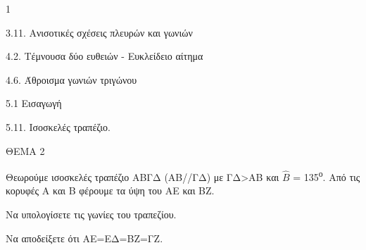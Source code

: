 \begin{ylh}{1}
    \item 3.11. Ανισοτικές σχέσεις πλευρών και γωνιών
    \item 4.2. Τέμνουσα δύο ευθειών - Ευκλείδειο αίτημα
    \item 4.6. Άθροισμα γωνιών τριγώνου
    \item 5.1 Εισαγωγή
    \item 5.11. Ισοσκελές τραπέζιο.
\end{ylh}

ΘΕΜΑ 2

Θεωρούμε ισοσκελές τραπέζιο ΑΒΓΔ (ΑΒ//ΓΔ) με ΓΔ\textgreater ΑΒ και $\widehat{Β}$ = 135\textsuperscript{ο}. Από τις κορυφές Α και Β φέρουμε τα ύψη του ΑΕ και ΒΖ.

\begin{alist}
\item Να υπολογίσετε τις γωνίες του τραπεζίου. 

\item Να αποδείξετε ότι ΑΕ=ΕΔ=ΒΖ=ΓΖ. 


\begin{center}
\end{center}
\end{alist}
